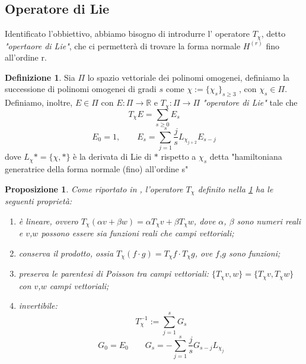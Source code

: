 \documentclass[a4paper,11pt,titlepage]{report}
\theoremstyle{definition}
\newtheorem{defn}{Definizione}[chapter]
\theoremstyle{plain}
\newtheorem{prop}{Proposizione}
\begin{document}
\subsection{Operatore di Lie}
Identificato l'obbiettivo, abbiamo bisogno di introdurre l' operatore $T_{\chi}$, detto \textit{"opertaore di Lie"}, che ci permetterà di trovare la forma normale $H^{(r)}$ fino all'ordine r.
\begin{defn}
	\label{defT}
	Sia $ \varPi $ lo spazio vettoriale dei polinomi omogenei, definiamo la successione di polinomi omogenei di gradi $s$ come $\chi:= \{\chi_s\}_{s\geq3} $ , con $ \chi_s \in \varPi $. \\Definiamo, inoltre, $E \in \varPi$ con $E:\varPi \longrightarrow \mathbb{R}$ e $T_\chi :\varPi \longrightarrow \varPi $ \textit{"operatore di Lie"} tale che
	$$ T_\chi E = \sum_{s\geq0} E_s $$
	$$E_0=1, \qquad E_s = \sum_{j=1}^{s} \frac{j}{s} \textit{L}_{\chi_{j + 2}}E_{s-j} $$ 
	dove $\textit{L}_{\chi} * = \{\chi, *\}$ è la derivata di Lie di $*$ rispetto a $\chi_s$ detta "hamiltoniana generatrice della forma normale (fino) all'ordine s"  
\end{defn}

\begin{prop}
Come riportato in \cite{1977}, l'operatore $T_\chi$ definito nella \ref{defT} ha le seguenti proprietà:
	\begin{enumerate}
		\item è lineare, ovvero $T_\chi(\alpha v+ \beta w)= \alpha T_\chi v+\beta T_\chi w$, dove $\alpha$, $\beta$ sono numeri reali e $v$,$w$ possono essere sia funzioni reali che campi vettoriali; 
		\item conserva il prodotto, ossia $T_\chi (f \cdot g) = T_\chi f \cdot T_\chi g$, ove $f$,$g$ sono funzioni;
		\item preserva le parentesi di Poisson tra campi vettoriali: $\{T_\chi{v,w}\} = \{T_\chi v,T_\chi w\}$ \\con $v$,$w$ campi vettoriali;
		\item invertibile: $$T_{\chi}^{-1} := \sum_{j=1}^{s} G_s$$
		$$ G_0=E_0 \qquad G_s = - \sum_{j=1}^{s} \frac{j}{s}G_{s-j} \textit{L}_{\chi_j}$$	
	\end{enumerate}	
\end{prop}
\end{document}

